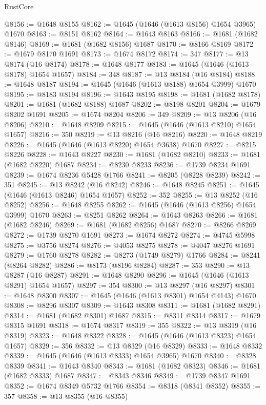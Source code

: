 \begin{lexlean}{RustCore}
\begin{coremodule}
@8156 := @1648 @8155
@8162 := @1645 (@1646 (@1613 @8156) @1654 @3965) @1670
@8163 := @8151 @8162
@8164 := @1643 @8163
@8166 := @1681 (@1682 @8146)
@8169 := @1681 (@1682 @8156) @1687
@8170 := @8166 @8169
@8172 := @1679 @8170 @1691
@8173 := @1674 @8172
@8174 := 347
@8177 := @13 @8174 (@16 @8174)
@8178 := @1648 @8177
@8183 := @1645 (@1646 (@1613 @8178) @1654 @1657)
@8184 := 348
@8187 := @13 @8184 (@16 @8184)
@8188 := @1648 @8187
@8194 := @1645 (@1646 (@1613 @8188) @1654 @3999) @1670
@8195 := @8183 @8194
@8196 := @1643 @8195
@8198 := @1681 (@1682 @8178)
@8201 := @1681 (@1682 @8188) @1687
@8202 := @8198 @8201
@8204 := @1679 @8202 @1691
@8205 := @1674 @8204
@8206 := 349
@8209 := @13 @8206 (@16 @8206)
@8210 := @1648 @8209
@8215 := @1645 (@1646 (@1613 @8210) @1654 @1657)
@8216 := 350
@8219 := @13 @8216 (@16 @8216)
@8220 := @1648 @8219
@8226 := @1645 (@1646 (@1613 @8220) @1654 @3638) @1670
@8227 := @8215 @8226
@8228 := @1643 @8227
@8230 := @1681 (@1682 @8210)
@8233 := @1681 (@1682 @8220) @1687
@8234 := @8230 @8233
@8236 := @1739 @8234 @1691
@8239 := @1674 @8236 @5428 @1766
@8241 := @8205 (@8228 @8239)
@8242 := 351
@8245 := @13 @8242 (@16 @8242)
@8246 := @1648 @8245
@8251 := @1645 (@1646 (@1613 @8246) @1654 @1657)
@8252 := 352
@8255 := @13 @8252 (@16 @8252)
@8256 := @1648 @8255
@8262 := @1645 (@1646 (@1613 @8256) @1654 @3999) @1670
@8263 := @8251 @8262
@8264 := @1643 @8263
@8266 := @1681 (@1682 @8246)
@8269 := @1681 (@1682 @8256) @1687
@8270 := @8266 @8269
@8272 := @1739 @8270 @1691
@8273 := @1674 @8272
@8274 := @4745 @5998
@8275 := @3756 @8274
@8276 := @4053 @8275
@8278 := @4047 @8276 @1691
@8279 := @1760 @8278
@8282 := @8273 (@1749 @8279) @1766
@8284 := @8241 (@8264 @8282)
@8286 := @8173 (@8196 @8284)
@8287 := 353
@8290 := @13 @8287 (@16 @8287)
@8291 := @1648 @8290
@8296 := @1645 (@1646 (@1613 @8291) @1654 @1657)
@8297 := 354
@8300 := @13 @8297 (@16 @8297)
@8301 := @1648 @8300
@8307 := @1645 (@1646 (@1613 @8301) @1654 @4143) @1670
@8308 := @8296 @8307
@8309 := @1643 @8308
@8311 := @1681 (@1682 @8291)
@8314 := @1681 (@1682 @8301) @1687
@8315 := @8311 @8314
@8317 := @1679 @8315 @1691
@8318 := @1674 @8317
@8319 := 355
@8322 := @13 @8319 (@16 @8319)
@8323 := @1648 @8322
@8328 := @1645 (@1646 (@1613 @8323) @1654 @1657)
@8329 := 356
@8332 := @13 @8329 (@16 @8329)
@8333 := @1648 @8332
@8339 := @1645 (@1646 (@1613 @8333) @1654 @3965) @1670
@8340 := @8328 @8339
@8341 := @1643 @8340
@8343 := @1681 (@1682 @8323)
@8346 := @1681 (@1682 @8333) @1687
@8347 := @8343 @8346
@8349 := @1739 @8347 @1691
@8352 := @1674 @8349 @5732 @1766
@8354 := @8318 (@8341 @8352)
@8355 := 357
@8358 := @13 @8355 (@16 @8355)

\end{coremodule}
\end{lexlean}

